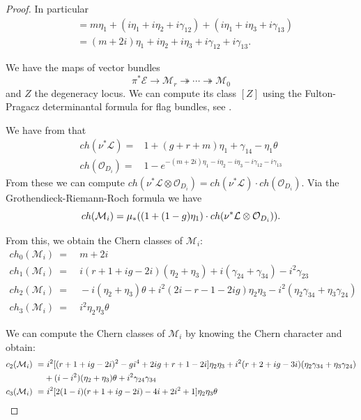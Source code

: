 \documentclass{article}
\theoremstyle{plain}
\theoremstyle{definition}
\def\OO{\mathcal{O}}
\def\cM{\mathcal{M}}
\begin{document}
\begin{proof}
In particular 
\begin{align*}
	[D_i] &= m\eta_1 +(i\eta_1 +i\eta_2 +i\gamma_{12}) + (i\eta_1 +i\eta_3 +i\gamma_{13}) \\
	&= (m+2i)\eta_1 +i\eta_2 +i\eta_3 + i\gamma_{12} + i\gamma_{13}.
\end{align*}  

We have the maps of vector bundles 
\[ \pi^*\mathcal{E} \rightarrow \mathcal{M}_r \twoheadrightarrow \cdots \twoheadrightarrow \mathcal{M}_0 \]
and $Z$ the degeneracy locus. We can compute its class $[Z]$ using the Fulton-Pragacz determinantal formula for flag bundles, see \cite{FultonPragaczformula}. 

We have from \cite[Chapter VIII]{ACGC1} that 
\begin{align*}
	ch(\nu^*\mathcal{L}) =& 1 + (g+r+m) \eta_1 + \gamma_{14}-\eta_1\theta \\ 
	ch(\mathcal{O}_{D_i}) =& 1 - e^{-(m+2i)\eta_1-i\eta_2 - i\eta_3 -i\gamma_{12} -i\gamma_{13}}
\end{align*}
From these we can compute $ch(\nu^*\mathcal{L}\otimes \OO_{D_i}) = ch(\nu^*\mathcal{L})\cdot ch(\OO_{D_i})$. Via the Grothendieck-Riemann-Roch formula we have 
\[ ch(\mathcal{M}_i) = \mu_{*}\text{\Large (}\text{\large(}1+(1-g)\eta_1\text{\large)}\cdot ch(\nu^*\mathcal{L}\otimes \OO_{D_i})\text{\Large )}. \]

From this, we obtain the Chern classes of $\mathcal{M}_i$:
\begin{align*}
	ch_0(\mathcal{M}_i)\ = & \ m+2i \\
	ch_1(\mathcal{M}_i)\ = & \ i(r+1+ig-2i)(\eta_2 + \eta_3) + i(\gamma_{24}+\gamma_{34}) - i^2\gamma_{23} \\
	ch_2(\cM_i) \ = & \ -i(\eta_2+\eta_3)\theta + i^2(2i-r-1-2ig)\eta_2\eta_3 - i^2(\eta_2\gamma_{34} + \eta_3 \gamma_{24}) \\ 
	ch_3(\cM_i) \ = & \ i^2 \eta_2\eta_3\theta 
\end{align*}

We can compute the Chern classes of $\cM_i$ by knowing the Chern character and obtain: 
\begin{align*}
	c_2(\cM_i) \ = & \ i^2\text{\Large [}(r+1+ig-2i)^2 - gi^4 + 2ig +r+1-2i \text{\Large ]} \eta_2 \eta_3 + i^2(r+2+ig-3i)(\eta_2\gamma_{34}+ \eta_3\gamma_{24}) \\ &+(i-i^2)(\eta_2 +\eta_3)\theta + i^2 \gamma_{24}\gamma_{34} \\
	c_3(\cM_i) \ = & \ i^2\text{\Large [} 2(1-i)(r+1+ig-2i) - 4i +2i^2 +1 \text{\Large ]}\eta_2\eta_3\theta
\end{align*}


\end{proof}
\end{document}
